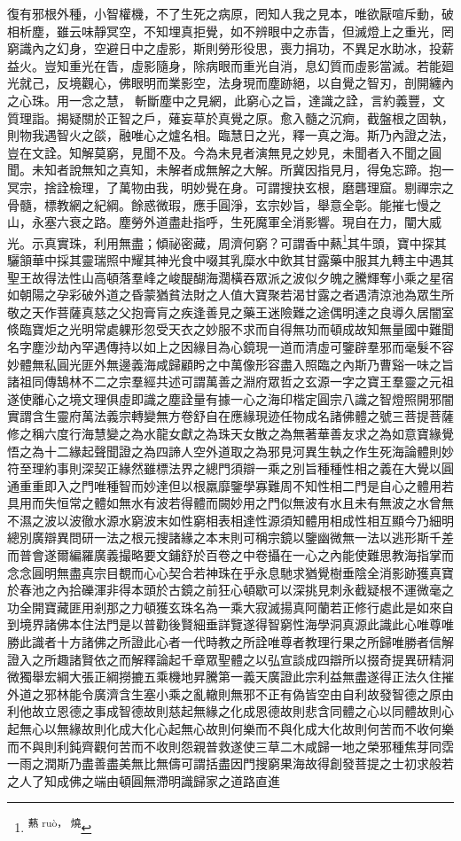復有邪根外種，小智權機，不了生死之病原，罔知人我之見本，唯欲厭喧斥動，破相析塵，雖云味靜冥空，不知埋真拒覺，如不辨眼中之赤眚，但滅燈上之重光，罔窮識內之幻身，空避日中之虛影，斯則勞形役思，喪力捐功，不異足水助冰，投薪益火。豈知重光在眚，虛影隨身，除病眼而重光自消，息幻質而虛影當滅。若能廻光就己，反境觀心，佛眼明而業影空，法身現而塵跡絕，以自覺之智刃，剖開纏內之心珠。用一念之慧，𨦟斬斷塵中之見網，此窮心之旨，達識之詮，言約義豐，文質理詣。揭疑關於正智之戶，薙妄草於真覺之原。愈入髓之沉痾，截盤根之固執，則物我遇智火之燄，融唯心之爐名相。臨慧日之光，釋一真之海。斯乃內證之法，豈在文詮。知解莫窮，見聞不及。今為未見者演無見之妙見，未聞者入不聞之圓聞。未知者說無知之真知，未解者成無解之大解。所冀因指見月，得兔忘蹄。抱一冥宗，捨詮檢理，了萬物由我，明妙覺在身。可謂搜抉玄根，磨礱理窟。剔禪宗之骨髓，標教網之紀綱。餘惑微瑕，應手圓淨，玄宗妙旨，舉意全彰。能摧七慢之山，永塞六衰之路。塵勞外道盡赴指呼，生死魔軍全消影響。現自在力，闡大威光。示真實珠，利用無盡；傾祕密藏，周濟何窮？可謂香中爇\footnote{\textsuperscript{爇 ruò， 燒 }}其牛頭，寶中探其驪頷華中採其靈瑞照中耀其神光食中啜其乳糜水中飲其甘露藥中服其九轉主中遇其聖王故得法性山高頓落羣峰之峻醍醐海濶橫吞眾派之波似夕魄之騰輝奪小乘之星宿如朝陽之孕彩破外道之昏蒙猶貧法財之人值大寶聚若渴甘露之者遇清涼池為眾生所敬之天作菩薩真慈之父抱膏肓之疾逢善見之藥王迷險難之途偶明達之良導久居闇室倐臨寶炬之光明常處躶形忽受天衣之妙服不求而自得無功而頓成故知無量國中難聞名字塵沙劫內罕遇傳持以如上之因緣目為心鏡現一道而清虛可鑒辟羣邪而毫髮不容妙體無私圓光匪外無邊義海咸歸顧盻之中萬像形容盡入照臨之內斯乃曹谿一味之旨諸祖同傳鵠林不二之宗羣經共述可謂萬善之淵府眾哲之玄源一字之寶王羣靈之元祖遂使離心之境文理俱虛即識之塵詮量有據一心之海印楷定圓宗八識之智燈照開邪闇實謂含生靈府萬法義宗轉變無方卷舒自在應緣現迹任物成名諸佛體之號三菩提菩薩修之稱六度行海慧變之為水龍女獻之為珠天女散之為無著華善友求之為如意寶緣覺悟之為十二緣起聲聞證之為四諦人空外道取之為邪見河異生執之作生死海論體則妙符至理約事則深契正緣然雖標法界之總門須辯一乘之別旨種種性相之義在大覺以圓通重重即入之門唯種智而妙達但以根羸靡鑒學寡難周不知性相二門是自心之體用若具用而失恒常之體如無水有波若得體而闕妙用之門似無波有水且未有無波之水曾無不濕之波以波徹水源水窮波末如性窮相表相達性源須知體用相成性相互顯今乃細明總別廣辯異問研一法之根元搜諸緣之本末則可稱宗鏡以鑒幽微無一法以逃形斯千差而普會遂爾編羅廣義撮略要文鋪舒於百卷之中卷攝在一心之內能使難思教海指掌而念念圓明無盡真宗目覩而心心契合若神珠在乎永息馳求猶覺樹垂陰全消影跡獲真寶於春池之內拾礫渾非得本頭於古鏡之前狂心頓歇可以深挑見刺永截疑根不運微毫之功全開寶藏匪用剎那之力頓獲玄珠名為一乘大寂滅揚真阿蘭若正修行處此是如來自到境界諸佛本住法門是以普勸後賢細垂詳覽遂得智窮性海學洞真源此識此心唯尊唯勝此識者十方諸佛之所證此心者一代時教之所詮唯尊者教理行果之所歸唯勝者信解證入之所趣諸賢依之而解釋論起千章眾聖體之以弘宣談成四辯所以掇奇提異研精洞微獨舉宏綱大張正綱撈摝五乘機地昇騰第一義天廣證此宗利益無盡遂得正法久住摧外道之邪林能令廣濟含生塞小乘之亂轍則無邪不正有偽皆空由自利故發智德之原由利他故立恩德之事成智德故則慈起無緣之化成恩德故則悲含同體之心以同體故則心起無心以無緣故則化成大化心起無心故則何樂而不與化成大化故則何苦而不收何樂而不與則利鈍齊觀何苦而不收則怨親普救遂使三草二木咸歸一地之榮邪種焦芽同霑一雨之潤斯乃盡善盡美無比無儔可謂括盡因門搜窮果海故得創發菩提之士初求般若之人了知成佛之端由頓圓無滯明識歸家之道路直進
